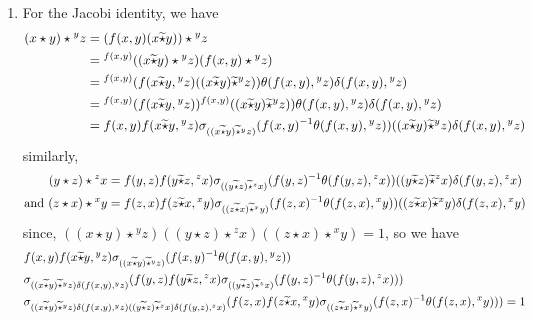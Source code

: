 \documentclass[10 pt,oneside,reqno,a4paper]{amsart}
\numberwithin{equation}{section}
\begin{document}
\begin{enumerate}
\item For the Jacobi identity, we have
\begin{align}
    (x\star y) \star {^yz}&= (f(x,y)(x\widetilde{\star} y)) \star {^yz} \notag
   \\&= {^{f(x,y)}((x\widetilde{\star} y)\star {^yz})}(f(x,y)\star {^yz}) \notag 
  \\&= {^{f(x,y)}(f(x\widetilde{\star} y,{^yz}) ((x\widetilde{\star} y) \widetilde{\star} {^yz})}) \theta(f(x,y), {^yz}) \delta(f(x,y), {^yz}) \notag 
   \\&={^{f(x,y)}(f(x\widetilde{\star} y,{^yz}))} {^{f(x,y)}((x\widetilde{\star} y) \widetilde{\star} {^yz})}) \theta(f(x,y), {^yz}) \delta(f(x,y), {^yz}) \notag 
   \\&= f(x,y) f(x\widetilde{\star} y,{^yz})  \sigma_{((x\widetilde{\star} y) \widetilde{\star} {^yz})}(f(x,y)^{-1}\theta(f(x,y), {^yz})) ((x\widetilde{\star} y) \widetilde {\star} {^yz})\delta(f(x,y), {^yz}) \notag
\end{align}
similarly,
\begin{align}
    (y\star z) \star {^zx}&= f(y,z) f(y\widetilde{\star} z,{^zx})  \sigma_{((y\widetilde{\star} z) \widetilde{\star} {^zx})}(f(y,z)^{-1}\theta(f(y,z), {^zx})) ((y\widetilde{\star} z) \widetilde {\star} {^zx})\delta(f(y,z), {^zx}) \notag \\
    \text{and}~ (z\star x) \star {^xy}&= f(z,x) f(z\widetilde{\star} x,{^xy})  \sigma_{((z\widetilde{\star} x) \widetilde{\star} {^xy})}(f(z,x)^{-1}\theta(f(z,x), {^xy})) ((z\widetilde{\star} x) \widetilde {\star} {^xy})\delta(f(z,x), {^xy}) \notag
\end{align}
since, $((x\star y) \star {^yz})((y\star z) \star {^zx})((z\star x) \star {^xy})=1$, so we have 
\begin{align}
    &f(x,y) f(x\widetilde{\star} y,{^yz})  \sigma_{((x\widetilde{\star} y) \widetilde{\star} {^yz})}(f(x,y)^{-1}\theta(f(x,y), {^yz}))  \notag\\& \sigma_{((x\widetilde{\star} y) \widetilde {\star} {^yz})\delta(f(x,y), {^yz})}(f(y,z) f(y\widetilde{\star} z,{^zx})  \sigma_{((y\widetilde{\star} z) \widetilde{\star} {^zx})}(f(y,z)^{-1}\theta(f(y,z), {^zx}))) \notag \\& \sigma_{((x\widetilde{\star} y) \widetilde {\star} {^yz})\delta(f(x,y), {^yz})  ((y\widetilde{\star} z) \widetilde {\star} {^zx})\delta(f(y,z), {^zx}) }(f(z,x) f(z\widetilde{\star} x,{^xy})  \sigma_{((z\widetilde{\star} x) \widetilde{\star} {^xy})}(f(z,x)^{-1}\theta(f(z,x), {^xy}))) =1 \notag\\

\end{align}
\end{enumerate}
\end{document}
